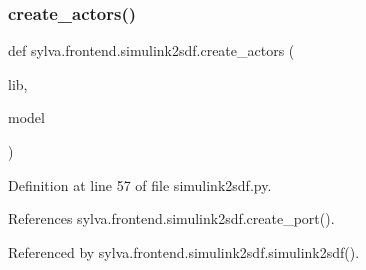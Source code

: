 \subsubsection{\texorpdfstring{create\+\_\+actors()}{create\_actors()}}
{\footnotesize\ttfamily def sylva.\+frontend.\+simulink2sdf.\+create\+\_\+actors (\begin{DoxyParamCaption}\item[{}]{lib,  }\item[{}]{model }\end{DoxyParamCaption})}



Definition at line 57 of file simulink2sdf.\+py.



References sylva.\+frontend.\+simulink2sdf.\+create\+\_\+port().



Referenced by sylva.\+frontend.\+simulink2sdf.\+simulink2sdf().


